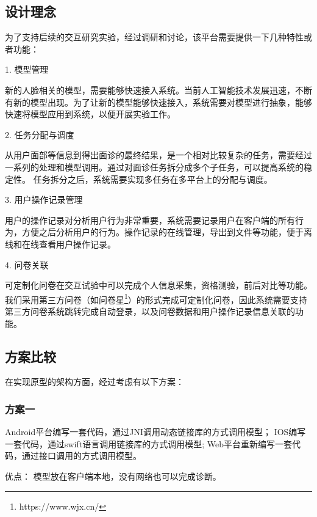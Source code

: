 \subsection{设计理念}




为了支持后续的交互研究实验，经过调研和讨论，该平台需要提供一下几种特性或者功能：

1. 模型管理

新的人脸相关的模型，需要能够快速接入系统。当前人工智能技术发展迅速，不断有新的模型出现。为了让新的模型能够快速接入，系统需要对模型进行抽象，能够快速将模型应用到系统，以便开展实验工作。

2. 任务分配与调度

从用户面部等信息到得出面诊的最终结果，是一个相对比较复杂的任务，需要经过一系列的处理和模型调用。通过对面诊任务拆分成多个子任务，可以提高系统的稳定性。
任务拆分之后，系统需要实现多任务在多平台上的分配与调度。

3. 用户操作记录管理

用户的操作记录对分析用户行为非常重要，系统需要记录用户在客户端的所有行为，方便之后分析用户的行为。操作记录的在线管理，导出到文件等功能，便于离线和在线查看用户操作记录。

4. 问卷关联

可定制化问卷在交互试验中可以完成个人信息采集，资格测验，前后对比等功能。
我们采用第三方问卷（如问卷星\footnote{https://www.wjx.cn/}）的形式完成可定制化问卷，因此系统需要支持第三方问卷系统跳转完成自动登录，以及问卷数据和用户操作记录信息关联的功能。



\subsection{方案比较}
在实现原型的架构方面，经过考虑有以下方案：

\subsubsection{方案一}
Android平台编写一套代码，通过JNI调用动态链接库的方式调用模型； IOS编写一套代码，通过swift语言调用链接库的方式调用模型; Web平台重新编写一套代码，通过接口调用的方式调用模型。

优点： 模型放在客户端本地，没有网络也可以完成诊断。

